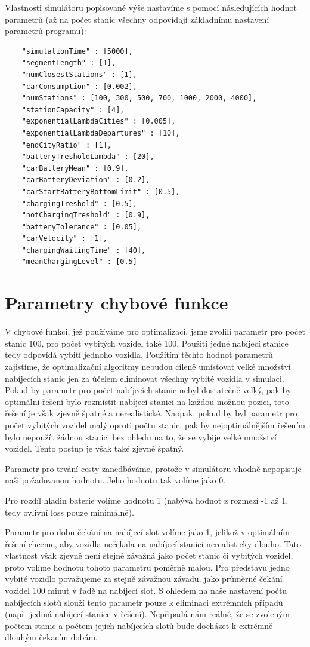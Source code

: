 Vlastnosti simulátoru popisované výše nastavíme s pomocí následujících hodnot parametrů
(až na počet stanic všechny odpovídají základnímu nastavení parametrů programu):

\begin{Verbatim}
    "simulationTime" : [5000],
    "segmentLength" : [1],
    "numClosestStations" : [1],
    "carConsumption" : [0.002],
    "numStations" : [100, 300, 500, 700, 1000, 2000, 4000],
    "stationCapacity" : [4],
    "exponentialLambdaCities" : [0.005],
    "exponentialLambdaDepartures" : [10],
    "endCityRatio" : [1],
    "batteryTresholdLambda" : [20],
    "carBatteryMean" : [0.9],
    "carBatteryDeviation" : [0.2],
    "carStartBatteryBottomLimit" : [0.5],
    "chargingTreshold" : [0.5],
    "notChargingTreshold" : [0.9],
    "batteryTolerance" : [0.05],
    "carVelocity" : [1],
    "chargingWaitingTime" : [40],
    "meanChargingLevel" : [0.5]
\end{Verbatim}


\section{Parametry chybové funkce}
V chybové funkci, jež používáme pro optimalizaci, jsme zvolili parametr pro
počet stanic 100, pro počet vybitých vozidel také 100. Použití jedné nabíjecí
stanice tedy odpovídá vybití jednoho vozidla. Použítím těchto hodnot parametrů
zajistíme, že optimalizační algoritmy nebudou cíleně umísťovat velké množství
nabíjecích stanic jen za účelem eliminovat všechny vybité vozidla v simulaci.
Pokud by parametr pro počet nabíjecích stanic nebyl dostatečně velký, pak by 
optimální řešení bylo rozmístit nabíjecí stanici na každou možnou pozici, toto
řešení je však zjevně špatné a nerealistické. Naopak, pokud by byl parametr pro počet 
vybitých vozidel malý oproti počtu stanic, pak by nejoptimálnějším řešením
bylo nepoužít žádnou stanici bez ohledu na to, že se vybije velké množství vozidel.
Tento postup je však také zjevně špatný.

Parametr pro trvání cesty zanedbáváme, protože v simulátoru vhodně nepopisuje 
naši požadovanou hodnotu. Jeho hodnotu tak volíme jako 0.

Pro rozdíl hladin baterie volíme hodnotu 1 (nabývá hodnot z rozmezí -1 až 1, 
tedy ovlivní loss pouze minimálně). 

Parametr pro dobu čekání na nabíjecí slot
volíme jako 1, jelikož v optimálním řešení chceme, aby vozidla nečekala na nabíjecí 
stanici nerealisticky dlouho. Tato vlastnost však zjevně není stejně závažná 
jako počet stanic či vybitých vozidel, proto volíme hodnotu tohoto parametru poměrně malou.
Pro představu jedno vybité vozidlo považujeme za stejně závažnou závadu, jako
průměrné čekání vozidel 100 minut v řadě na nabíjecí slot. S ohledem na naše
nastavení počtu nabíjecích slotů slouží tento parametr pouze k eliminaci extrémních
případů (např. jediná nabíjecí stanice v řešení). Nepřipadá nám reálné, že se zvoleným
počtem stanic a počtem jejich nabíjecích slotů bude docházet k extrémně dlouhým čekacím dobám.


